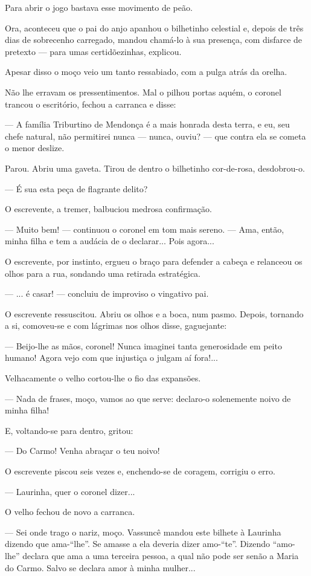 Para abrir o jogo bastava esse movimento de peão.

Ora, aconteceu que o pai do anjo apanhou o bilhetinho celestial e,
depois de três dias de sobrecenho carregado, mandou chamá-lo à sua
presença, com disfarce de pretexto --- para umas certidõezinhas,
explicou.

Apesar disso o moço veio um tanto ressabiado, com a pulga atrás da
orelha.

Não lhe erravam os pressentimentos. Mal o pilhou portas aquém, o coronel
trancou o escritório, fechou a carranca e disse:

--- A família Triburtino de Mendonça é a mais honrada desta terra, e eu,
seu chefe natural, não permitirei nunca --- nunca, ouviu? --- que contra
ela se cometa o menor deslize.

Parou. Abriu uma gaveta. Tirou de dentro o bilhetinho cor-de-rosa,
desdobrou-o.

--- É sua esta peça de flagrante delito?

O escrevente, a tremer, balbuciou medrosa confirmação.

--- Muito bem! --- continuou o coronel em tom mais sereno. --- Ama,
então, minha filha e tem a audácia de o declarar... Pois agora...

O escrevente, por instinto, ergueu o braço para defender a cabeça e
relanceou os olhos para a rua, sondando uma retirada estratégica.

--- ... é casar! --- concluiu de improviso o vingativo pai.

O escrevente ressuscitou. Abriu os olhos e a boca, num pasmo. Depois,
tornando a si, comoveu-se e com lágrimas nos olhos disse, gaguejante:

--- Beijo-lhe as mãos, coronel! Nunca imaginei tanta generosidade em
peito humano! Agora vejo com que injustiça o julgam aí fora!...

Velhacamente o velho cortou-lhe o fio das expansões.

--- Nada de frases, moço, vamos ao que serve: declaro-o solenemente
noivo de minha filha!

E, voltando-se para dentro, gritou:

--- Do Carmo! Venha abraçar o teu noivo!

O escrevente piscou seis vezes e, enchendo-se de coragem, corrigiu o
erro.

--- Laurinha, quer o coronel dizer...

O velho fechou de novo a carranca.

--- Sei onde trago o nariz, moço. Vassuncê mandou este bilhete à
Laurinha dizendo que ama-``lhe''. Se amasse a ela deveria dizer
amo-``te''. Dizendo ``amo-lhe'' declara que ama a uma terceira pessoa, a
qual não pode ser senão a Maria do Carmo. Salvo se declara amor à minha
mulher...


